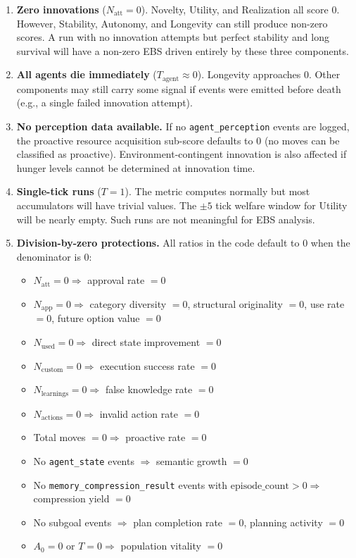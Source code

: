 \documentclass[a4paper, 11pt]{article}
\newcommand{\Natt}{N_{\text{att}}}
\newcommand{\Napp}{N_{\text{app}}}
\newcommand{\Nused}{N_{\text{used}}}
\newcommand{\Ncustom}{N_{\text{custom}}}
\begin{document}
\begin{enumerate}
    \item \textbf{Zero innovations} ($\Natt = 0$). Novelty, Utility, and Realization all score $0$. However, Stability, Autonomy, and Longevity can still produce non-zero scores. A run with no innovation attempts but perfect stability and long survival will have a non-zero EBS driven entirely by these three components.

    \item \textbf{All agents die immediately} ($T_{\text{agent}} \approx 0$). Longevity approaches $0$. Other components may still carry some signal if events were emitted before death (e.g., a single failed innovation attempt).

    \item \textbf{No perception data available.} If no \texttt{agent\_perception} events are logged, the proactive resource acquisition sub-score defaults to $0$ (no moves can be classified as proactive). Environment-contingent innovation is also affected if hunger levels cannot be determined at innovation time.

    \item \textbf{Single-tick runs} ($T = 1$). The metric computes normally but most accumulators will have trivial values. The $\pm 5$ tick welfare window for Utility will be nearly empty. Such runs are not meaningful for EBS analysis.

    \item \textbf{Division-by-zero protections.} All ratios in the code default to $0$ when the denominator is $0$:
    \begin{itemize}[nosep]
        \item $\Natt = 0 \Rightarrow$ approval rate $= 0$
        \item $\Napp = 0 \Rightarrow$ category diversity $= 0$, structural originality $= 0$, use rate $= 0$, future option value $= 0$
        \item $\Nused = 0 \Rightarrow$ direct state improvement $= 0$
        \item $\Ncustom = 0 \Rightarrow$ execution success rate $= 0$
        \item $N_{\text{learnings}} = 0 \Rightarrow$ false knowledge rate $= 0$
        \item $N_{\text{actions}} = 0 \Rightarrow$ invalid action rate $= 0$
        \item Total moves $= 0 \Rightarrow$ proactive rate $= 0$
        \item No \texttt{agent\_state} events $\Rightarrow$ semantic growth $= 0$
        \item No \texttt{memory\_compression\_result} events with $\text{episode\_count} > 0 \Rightarrow$ compression yield $= 0$
        \item No subgoal events $\Rightarrow$ plan completion rate $= 0$, planning activity $= 0$
        \item $A_0 = 0$ or $T = 0 \Rightarrow$ population vitality $= 0$
    \end{itemize}
\end{enumerate}
\end{document}
